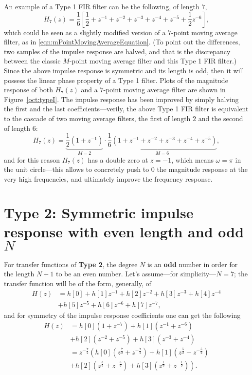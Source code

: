 \documentclass[\documentfontsize, twocolumn]{\classname}
\begin{document}
An example of a Type 1 FIR filter can be the following, of length $7$,
\[
    H_7(z) = \frac 1 6 \left[\frac 1 2 + z^{-1} + z^{-2} + z^{-3} + z^{-4} + z^{-5} + \frac 1 2z^{-6}\right],
\]
which could be seen as a slightly modified version of a $7$-point moving average filter, as in \ref{eqn:mPointMovingAverageEquation}. (To point out the differences, two samples of the impulse response are halved, and that is the discrepancy between the classic $M$-point moving average filter and this Type 1 FIR filter.) Since the above impulse response is symmetric and its length is odd, then it will possess the linear phase property of a Type 1 filter. Plots of the magnitude response of both $H_7(z)$ and a $7$-point moving average filter are shown in Figure~\ref{oct:typeI}. The impulse response has been improved by simply halving the first and the last coefficients---verily, the above Type 1 FIR filter is equivalent to the cascade of two moving average filters, the first of length $2$ and the second of length $6$:
\[
    H_7(z) = \underbrace{\frac 1 2\left(1 + z^{-1}\right)}_{M=2}\cdot\underbrace{\frac 1 6 \left(1 + z^{-1} + z^{-2} + z^{-3} + z^{-4} + z^{-5}\right)}_{M=6},
\]
and for this reason $H_7(z)$ has a double zero at $z=-1$, which means $\omega = \pi$ in the unit circle---this allows to concretely push to $0$ the magnitude response at the very high frequencies, and ultimately improve the frequency response.


\section{Type 2: Symmetric impulse response with even length and odd $N$}

For transfer functions of \textbf{Type 2}, the degree $N$ is an \textbf{odd} number in order for the length $N+1$ to be an even number. Let's assume---for simplicity---$N=7$; the transfer function will be of the form, generally, of
\begin{align*}
    H(z) &= h[0]
        + h[1]z^{-1}
        + h[2]z^{-2}
        + h[3]z^{-3}
        + h[4]z^{-4}\\
        & + h[5]z^{-5}
        + h[6]z^{-6}
        + h[7]z^{-7},
\end{align*}
and for symmetry of the impulse response coefficients one can get the following
\begin{align*}
    H(z) &= h[0](1 + z^{-7})
        + h[1](z^{-1} + z^{-6})\\
        & + h[2](z^{-2} + z^{-5})
        + h[3](z^{-3} + z^{-4})\\
         &= z^{-\frac 7 2}\left(h[0](z^{\frac 7 2} + z^{-\frac 7 2})
        + h[1](z^{\frac 5 2} + z^{-\frac 5 2})\right.\\
        & \left.+ h[2](z^{\frac 3 2} + z^{-\frac 32})
        + h[3](z^{\frac 1 2} + z^{-\frac 1 2})\right).
\end{align*}
\end{document}
